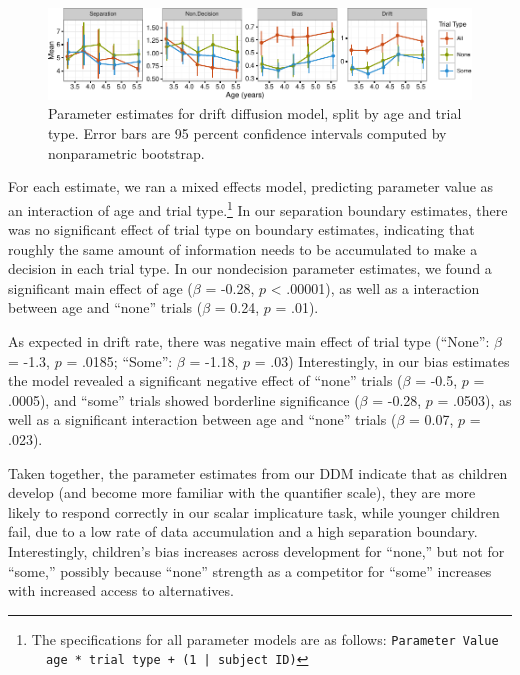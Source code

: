 \documentclass[10pt, letterpaper]{article}
\newenvironment{CodeChunk}{}{}
\begin{document}
\begin{CodeChunk}
\begin{figure}[t]

{\centering \includegraphics{figs/devo_param_plot-1} 

}

\caption[Parameter estimates for drift diffusion model, split by age and trial type]{Parameter estimates for drift diffusion model, split by age and trial type. Error bars are 95 percent confidence intervals computed by nonparametric bootstrap.}\label{fig:devo_param_plot}
\end{figure}
\end{CodeChunk}

For each estimate, we ran a mixed effects model, predicting parameter
value as an interaction of age and trial
type.\footnote{The specifications for all parameter models are as follows: \texttt{Parameter Value ~ age * trial type + (1 | subject ID)}}
In our separation boundary estimates, there was no significant effect of
trial type on boundary estimates, indicating that roughly the same
amount of information needs to be accumulated to make a decision in each
trial type. In our nondecision parameter estimates, we found a
significant main effect of age (\(\beta\) = -0.28, \(p\) \textless{}
.00001), as well as a interaction between age and ``none'' trials
(\(\beta\) = 0.24, \(p\) = .01).

As expected in drift rate, there was negative main effect of trial type
(``None'': \(\beta\) = -1.3, \(p\) = .0185; ``Some'': \(\beta\) = -1.18,
\(p\) = .03) Interestingly, in our bias estimates the model revealed a
significant negative effect of ``none'' trials (\(\beta\) = -0.5, \(p\)
= .0005), and ``some'' trials showed borderline significance (\(\beta\)
= -0.28, \(p\) = .0503), as well as a significant interaction between
age and ``none'' trials (\(\beta\) = 0.07, \(p\) = .023).

Taken together, the parameter estimates from our DDM indicate that as
children develop (and become more familiar with the quantifier scale),
they are more likely to respond correctly in our scalar implicature
task, while younger children fail, due to a low rate of data
accumulation and a high separation boundary. Interestingly, children's
bias increases across development for ``none,'' but not for ``some,''
possibly because ``none'' strength as a competitor for ``some''
increases with increased access to alternatives.
\end{document}
